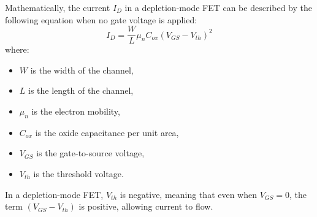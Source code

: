 Mathematically, the current \( I_D \) in a depletion-mode FET can be described by the following equation when no gate voltage is applied:
\[ I_D = \frac{W}{L} \mu_n C_{ox} (V_{GS} - V_{th})^2 \]
where:
\begin{itemize}
    \item \( W \) is the width of the channel,
    \item \( L \) is the length of the channel,
    \item \( \mu_n \) is the electron mobility,
    \item \( C_{ox} \) is the oxide capacitance per unit area,
    \item \( V_{GS} \) is the gate-to-source voltage,
    \item \( V_{th} \) is the threshold voltage.
\end{itemize}

In a depletion-mode FET, \( V_{th} \) is negative, meaning that even when \( V_{GS} = 0 \), the term \( (V_{GS} - V_{th}) \) is positive, allowing current to flow.

